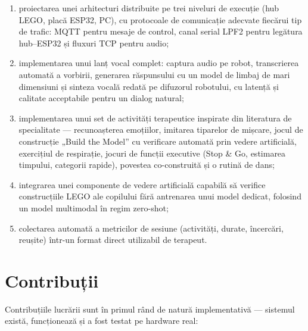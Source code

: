 \begin{enumerate}
    \item proiectarea unei arhitecturi distribuite pe trei niveluri de execuție (hub LEGO, placă ESP32, PC), cu protocoale de comunicație adecvate fiecărui tip de trafic: MQTT pentru mesaje de control, canal serial LPF2 pentru legătura hub--ESP32 și fluxuri TCP pentru audio;
    \item implementarea unui lanț vocal complet: captura audio pe robot, transcrierea automată a vorbirii, generarea răspunsului cu un model de limbaj de mari dimensiuni și sinteza vocală redată pe difuzorul robotului, cu latență și calitate acceptabile pentru un dialog natural;
    \item implementarea unui set de activități terapeutice inspirate din literatura de specialitate — recunoașterea emoțiilor, imitarea tiparelor de mișcare, jocul de construcție „Build the Model” cu verificare automată prin vedere artificială, exercițiul de respirație, jocuri de funcții executive (Stop \& Go, estimarea timpului, categorii rapide), povestea co-construită și o rutină de dans;
    \item integrarea unei componente de vedere artificială capabilă să verifice construcțiile LEGO ale copilului fără antrenarea unui model dedicat, folosind un model multimodal în regim zero-shot;
    \item colectarea automată a metricilor de sesiune (activități, durate, încercări, reușite) într-un format direct utilizabil de terapeut.
\end{enumerate}

\section{Contribuții}

Contribuțiile lucrării sunt în primul rând de natură implementativă — sistemul există, funcționează și a fost testat pe hardware real:

